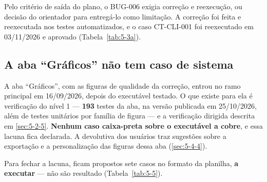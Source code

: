 Pelo critério de saída do plano, o BUG-006 exigia correção e reexecução, ou decisão do orientador para entregá-lo como limitação. A correção foi feita e reexecutada nos testes automatizados, e o caso CT-CLI-001 foi reexecutado em 03/11/2026 e aprovado (Tabela~\ref{tab:5-3a}).


\subsection{A aba ``Gráficos'' não tem caso de sistema}\label{sec:5-2-4}

A aba ``Gráficos'', com as figuras de qualidade da correção, entrou no ramo principal em 16/09/2026, depois do executável testado. O que existe para ela é verificação do nível 1 --- \textbf{193} testes da aba, na versão publicada em 25/10/2026, além de testes unitários por família de figura --- e a verificação dirigida descrita em \ref{sec:5-2-5}. \textbf{Nenhum caso caixa-preta sobre o executável a cobre}, e essa lacuna fica declarada. A devolutiva dos usuários traz sugestões sobre a exportação e a personalização das figuras dessa aba (\ref{sec:5-4-4}).


Para fechar a lacuna, ficam propostos sete casos no formato da planilha, \textbf{a executar} --- não são resultado (Tabela~\ref{tab:5-5}).

